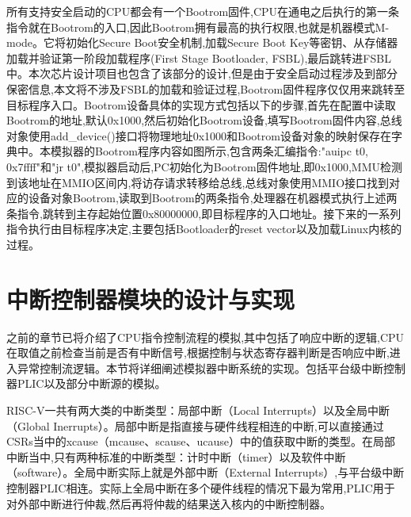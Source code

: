 所有支持安全启动的CPU都会有一个Bootrom固件,CPU在通电之后执行的第一条指令就在Bootrom的入口,因此Bootrom拥有最高的执行权限,也就是机器模式M-mode。它将初始化Secure Boot安全机制,加载Secure Boot Key等密钥、从存储器加载并验证第一阶段加载程序(First Stage Bootloader, FSBL),最后跳转进FSBL中。本次芯片设计项目也包含了该部分的设计,但是由于安全启动过程涉及到部分保密信息,本文将不涉及FSBL的加载和验证过程,Bootrom固件程序仅仅用来跳转至目标程序入口。Bootrom设备具体的实现方式包括以下的步骤,首先在配置中读取Bootrom的地址,默认0x1000,然后初始化Bootrom设备,填写Bootrom固件内容,总线对象使用add\_device()接口将物理地址0x1000和Bootrom设备对象的映射保存在字典中。本模拟器的Bootrom程序内容如图所示,包含两条汇编指令:"auipc	t0, 0x7ffff"和"jr 	t0",模拟器启动后,PC初始化为Bootrom固件地址,即0x1000,MMU检测到该地址在MMIO区间内,将访存请求转移给总线,总线对象使用MMIO接口找到对应的设备对象Bootrom,读取到Bootrom的两条指令,处理器在机器模式执行上述两条指令,跳转到主存起始位置0x80000000,即目标程序的入口地址。接下来的一系列指令执行由目标程序决定,主要包括Bootloader的reset vector以及加载Linux内核的过程。

\section{中断控制器模块的设计与实现}

之前的章节已将介绍了CPU指令控制流程的模拟,其中包括了响应中断的逻辑,CPU在取值之前检查当前是否有中断信号,根据控制与状态寄存器判断是否响应中断,进入异常控制流逻辑。本节将详细阐述模拟器中断系统的实现。包括平台级中断控制器PLIC以及部分中断源的模拟。


RISC-V一共有两大类的中断类型：局部中断（Local Interrupts）以及全局中断（Global Inerrupts）。局部中断是指直接与硬件线程相连的中断,可以直接通过CSRs当中的xcause（mcause、scause、ucause）中的值获取中断的类型。在局部中断当中,只有两种标准的中断类型：计时中断（timer）以及软件中断（software）。全局中断实际上就是外部中断（External Interrupts）,与平台级中断控制器PLIC相连。实际上全局中断在多个硬件线程的情况下最为常用,PLIC用于对外部中断进行仲裁,然后再将仲裁的结果送入核内的中断控制器。


